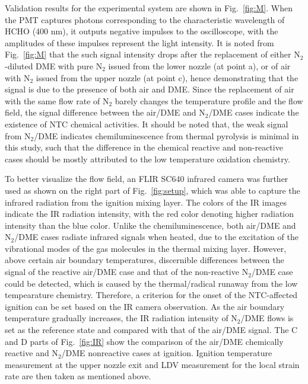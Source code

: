 \documentclass[review,3p,times]{elsarticleUS}
\begin{document}
Validation results for the experimental system are shown in Fig.~\ref{fig:M}.  When the PMT captures photons corresponding to the characteristic wavelength of HCHO (400 nm), it outputs negative impulses to the oscilloscope, with the amplitudes of these impulses represent the light intensity.  It is noted from Fig.~\ref{fig:M} that the such signal intensity drops after the replacement of either N$_2$-diluted DME with pure N$_2$ issued from the lower nozzle (at point a), or of air with N$_2$ issued from the upper nozzle (at point c), hence demonstrating that the signal is due to the presence of both air and DME. Since the replacement of air with the same flow rate of N$_2$ barely changes the temperature profile and the flow field, the signal difference between the air/DME and N$_2$/DME cases indicate the existence of NTC chemical activities.  It should be noted that, the weak signal from N$_2$/DME indicates chemiluminescence from thermal pyrolysis is minimal in this study, such that the difference in the chemical reactive and non-reactive cases should be mostly attributed to the low temperature oxidation chemistry.

To better visualize the flow field, an FLIR SC640 infrared camera was further used as shown on the right part of Fig.~\ref{fig:setup}, which was able to capture the infrared radiation from the ignition mixing layer.  The colors of the IR images indicate the IR radiation intensity, with the red color denoting higher radiation intensity than the blue color.  Unlike the chemiluminescence, both air/DME and N$_2$/DME cases radiate infrared signals when heated, due to the excitation of the vibrational modes of the gas molecules in the thermal mixing layer. However, above certain air boundary temperatures, discernible differences between the signal of the reactive air/DME case and that of the non-reactive N$_2$/DME case could be detected, which is caused by the thermal/radical runaway from the low tempearature chemistry.  Therefore, a criterion for the onset of the NTC-affected ignition can be set based on the IR camera observation. As the air boundary temperature gradually increases, the IR radiation intensity of N$_2$/DME flows is set as the reference state and compared with that of the air/DME signal. The C and D parts of Fig.~\ref{fig:IR} show the comparison of the air/DME chemically reactive and N$_2$/DME nonreactive cases at ignition. Ignition temperature measurement at the upper nozzle exit and LDV measurement for the local strain rate are then taken as mentioned above.
\end{document}
